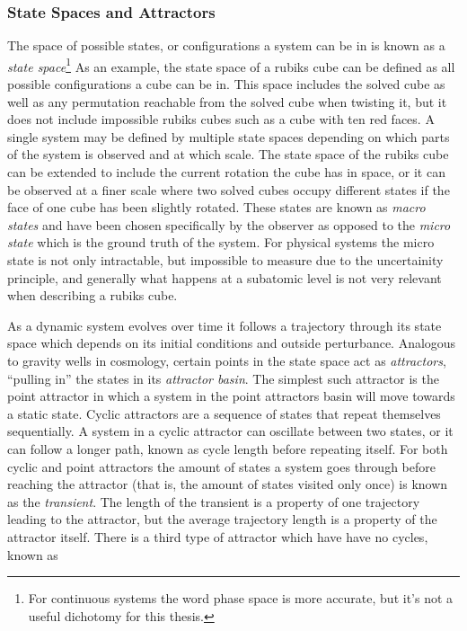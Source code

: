 \subsubsection{State Spaces and Attractors}
The space of possible states, or configurations a system can be in is known as a
\emph{state space}\footnote{For continuous systems the word phase space is more
  accurate, but it's not a useful dichotomy for this thesis.}
As an example, the state space of a rubiks cube can be defined as all possible
configurations a cube can be in.
This space includes the solved cube as well as any permutation reachable from
the solved cube when twisting it, but it does not include impossible rubiks
cubes such as a cube with ten red faces.
A single system may be defined by multiple state spaces depending on which parts
of the system is observed and at which scale.
The state space of the rubiks cube can be extended to include the current
rotation the cube has in space, or it can be observed at a finer scale where two
solved cubes occupy different states if the face of one cube has been slightly
rotated.
These states are known as \emph{macro states} and have been chosen specifically
by the observer as opposed to the \emph{micro state} which is the ground truth
of the system.
For physical systems the micro state is not only intractable, but impossible to
measure due to the uncertainity principle, and generally what happens at a
subatomic level is not very relevant when describing a rubiks cube.\par
%
As a dynamic system evolves over time it follows a trajectory through its state
space which depends on its initial conditions and outside perturbance.
Analogous to gravity wells in cosmology, certain points in the state space act
as \emph{attractors}, ``pulling in'' the states in its \emph{attractor basin}.
The simplest such attractor is the point attractor in which a system in the
point attractors basin will move towards a static state.
Cyclic attractors are a sequence of states that repeat themselves sequentially.
A system in a cyclic attractor can oscillate between two states, or it can
follow a longer path, known as cycle length before repeating itself.
For both cyclic and point attractors the amount of states a system goes through
before reaching the attractor (that is, the amount of states visited only once)
is known as the \emph{transient}.
The length of the transient is a property of one trajectory leading to the
attractor, but the average trajectory length is a property of the attractor
itself.
There is a third type of attractor which have have no cycles, known as
